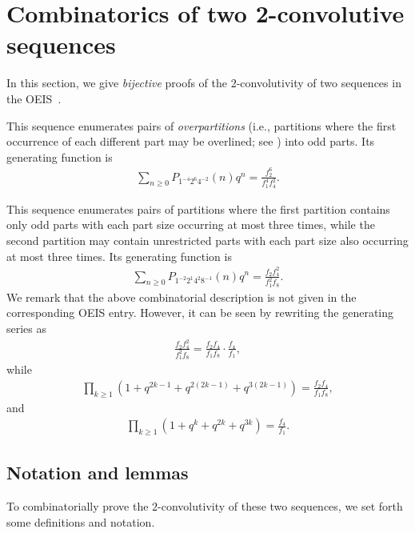 \documentclass[12pt,reqno]{amsart}
\numberwithin{equation}{section}
\theoremstyle{plain}
\theoremstyle{definition}
\theoremstyle{named}
\begin{document}
\section{Combinatorics of two 2-convolutive sequences}\label{sec:2cons}

In this section, we give \emph{bijective} proofs of the $2$-convolutivity of two sequences in the OEIS~\cite{OEIS}.
\begin{description}[itemsep=2pt]
	\item[A007096] This sequence enumerates pairs of \emph{overpartitions} (i.e., partitions where the first occurrence of each different part may be overlined; see \cite{CL2004}) into odd parts. Its generating function is
	\begin{align*}
		\sum_{n\ge 0} P_{1^{-4} 2^6 4^{-2}}(n) q^n = \frac{f_2^6}{f_1^4 f_4^2}.
	\end{align*}
	
	\item[A103258] This sequence enumerates pairs of partitions where the first partition contains only odd parts with each part size occurring at most three times, while the second partition may contain unrestricted parts with each part size also occurring at most three times. Its generating function is
	\begin{align*}
		\sum_{n\ge 0} P_{1^{-2} 2^1 4^{2} 8^{-1}}(n) q^n = \frac{f_2 f_4^2}{f_1^2 f_8}.
	\end{align*}
    We remark that the above combinatorial description is not given in the corresponding OEIS entry. However, it can be seen by rewriting the generating series as
    \begin{align*}
        \frac{f_2 f_4^2}{f_1^2 f_8} = \frac{f_2f_4}{f_1f_8}\cdot \frac{f_4}{f_1},
    \end{align*}
    while
    \begin{align*}
		\prod_{k\ge 1} (1+q^{2k-1}+q^{2(2k-1)}+q^{3(2k-1)}) = \frac{f_2f_4}{f_1f_8},
	\end{align*}
	and
	\begin{align*}
		\prod_{k\ge 1} (1+q^{k}+q^{2k}+q^{3k}) = \frac{f_4}{f_1}.
	\end{align*}
\end{description}

\subsection{Notation and lemmas}

To combinatorially prove the $2$-convolutivity of these two sequences, we set forth some definitions and notation.
\end{document}
